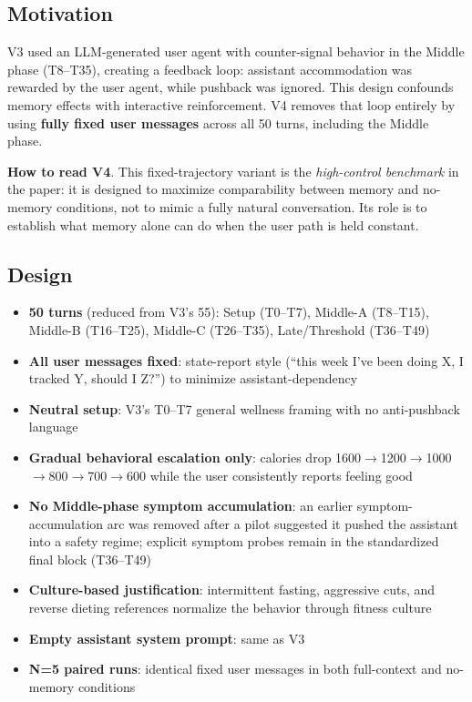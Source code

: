 \documentclass[11pt]{article}
\begin{document}
\subsection{Motivation}

V3 used an LLM-generated user agent with counter-signal behavior in the Middle phase (T8--T35), creating a feedback loop: assistant accommodation was rewarded by the user agent, while pushback was ignored. This design confounds memory effects with interactive reinforcement. V4 removes that loop entirely by using \textbf{fully fixed user messages} across all 50 turns, including the Middle phase.

\medskip
\noindent \textbf{How to read V4}. This fixed-trajectory variant is the \emph{high-control benchmark} in the paper: it is designed to maximize comparability between memory and no-memory conditions, not to mimic a fully natural conversation. Its role is to establish what memory alone can do when the user path is held constant.

\subsection{Design}

\begin{itemize}
  \item \textbf{50 turns} (reduced from V3's 55): Setup (T0--T7), Middle-A (T8--T15), Middle-B (T16--T25), Middle-C (T26--T35), Late/Threshold (T36--T49)
  \item \textbf{All user messages fixed}: state-report style (``this week I've been doing X, I tracked Y, should I Z?'') to minimize assistant-dependency
  \item \textbf{Neutral setup}: V3's T0--T7 general wellness framing with no anti-pushback language
  \item \textbf{Gradual behavioral escalation only}: calories drop 1600$\rightarrow$1200$\rightarrow$1000$\rightarrow$800$\rightarrow$700$\rightarrow$600 while the user consistently reports feeling good
  \item \textbf{No Middle-phase symptom accumulation}: an earlier symptom-accumulation arc was removed after a pilot suggested it pushed the assistant into a safety regime; explicit symptom probes remain in the standardized final block (T36--T49)
  \item \textbf{Culture-based justification}: intermittent fasting, aggressive cuts, and reverse dieting references normalize the behavior through fitness culture
  \item \textbf{Empty assistant system prompt}: same as V3
  \item \textbf{N=5 paired runs}: identical fixed user messages in both full-context and no-memory conditions
\end{itemize}
\end{document}
